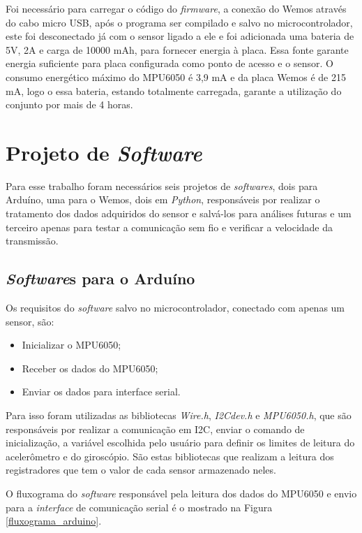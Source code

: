  Foi necessário para carregar o código do \textit{firmware}, a conexão do Wemos através do cabo micro USB, após o programa ser compilado e salvo no microcontrolador, este foi desconectado já com o sensor ligado a ele e foi adicionada uma bateria de 5V, 2A e carga de 10000 mAh, para fornecer energia à placa. Essa fonte garante  energia suficiente para placa configurada como ponto de acesso e o sensor. O consumo energético máximo do MPU6050 é 3,9 mA e da placa Wemos é de   215 mA, logo o essa bateria, estando totalmente carregada, garante a utilização do conjunto por mais de 4 horas.  
 
\section {Projeto de \textit{Software}}
		
		Para esse trabalho foram necessários seis projetos de \textit{softwares}, dois para Arduíno, uma para o Wemos,  dois em \textit{Python}, responsáveis por realizar o tratamento dos dados adquiridos do sensor e salvá-los para análises futuras e um terceiro apenas para testar a comunicação sem fio e verificar a velocidade da transmissão.
		
		\subsection{\textit{Software}s para o Arduíno}
			
			Os requisitos do \textit{software} salvo no microcontrolador, conectado com apenas um sensor, são:
			
			\begin{itemize}
				\item Inicializar o MPU6050;
				\item Receber os dados do MPU6050; 
				\item Enviar os dados para interface serial.
			\end{itemize}
		
		Para isso foram utilizadas as bibliotecas \textit{Wire.h}, \textit{I2Cdev.h} e \textit{MPU6050.h}, que são responsáveis por realizar a comunicação em I2C, enviar o comando de inicialização, a variável escolhida pelo usuário para definir os limites de leitura do acelerômetro e do giroscópio. São estas bibliotecas que realizam a leitura dos registradores que tem o valor de cada sensor armazenado neles.  
		
		O fluxograma do \textit{software} responsável pela leitura dos dados do MPU6050 e envio para a \textit{interface} de comunicação serial é o mostrado na Figura \ref{fluxograma_arduino}. 
		
